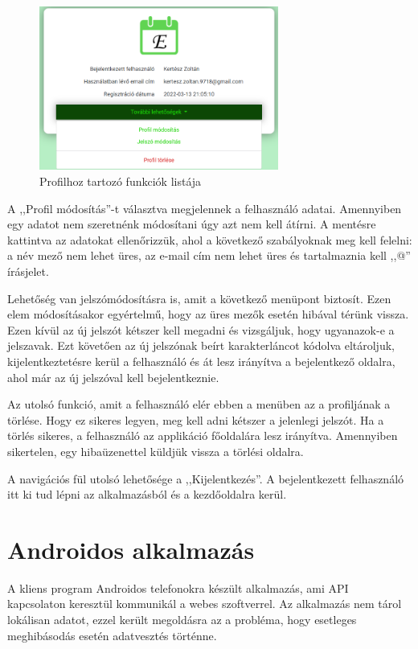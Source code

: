 \documentclass[
]{thesis-ekf}
\theoremstyle{definition}
\theoremstyle{remark}
\begin{document}
	\begin{figure}[ht!]
		\centering
		\includegraphics[width=0.7\textwidth]{web_app/web_profile_functions}
		\caption{Profilhoz tartozó funkciók listája}
		\label{figure:webapp_profile_functions}
	\end{figure}
	
	A ,,Profil módosítás''-t választva megjelennek a felhasználó adatai. Amennyiben egy adatot nem szeretnénk módosítani úgy azt nem kell átírni. A mentésre kattintva az adatokat ellenőrizzük,  ahol a következő szabályoknak meg kell felelni: a név mező nem lehet üres, az e-mail cím nem lehet üres és tartalmaznia kell ,,@'' írásjelet.
	
	Lehetőség van jelszómódosításra is, amit a következő menüpont biztosít. Ezen elem módosításakor egyértelmű, hogy az üres mezők esetén hibával térünk vissza. Ezen kívül az új jelszót kétszer kell megadni és vizsgáljuk, hogy ugyanazok-e a jelszavak. Ezt követően az új jelszónak beírt karakterláncot kódolva eltároljuk, kijelentkeztetésre kerül a felhasználó és át lesz irányítva a bejelentkező oldalra, ahol már az új jelszóval kell bejelentkeznie.
	
	Az utolsó funkció, amit a felhasználó elér ebben a menüben az a profiljának a törlése. Hogy ez sikeres legyen, meg kell adni kétszer a jelenlegi jelszót. Ha a törlés sikeres, a felhasználó az applikáció főoldalára lesz irányítva. Amennyiben sikertelen, egy hibaüzenettel küldjük vissza a törlési oldalra.
	
	A navigációs fül utolsó lehetősége a ,,Kijelentkezés''. A bejelentkezett felhasználó itt ki tud lépni az alkalmazásból és a kezdőoldalra kerül. 
	
	\section{Androidos alkalmazás}
	A kliens program Androidos telefonokra készült alkalmazás, ami API~\cite{api_basic} kapcsolaton keresztül kommunikál a webes szoftverrel. Az alkalmazás nem tárol lokálisan adatot, ezzel került megoldásra az a probléma, hogy esetleges meghibásodás esetén adatvesztés történne. 
	
\end{document}
